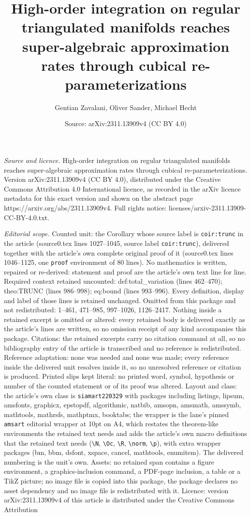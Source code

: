 \documentclass[10pt,a4paper]{amsart}
\title[High-order integration on regular triangulated manifolds rea]{High-order integration on regular triangulated manifolds reaches super-algebraic approximation rates through cubical re-parameterizations}
\author{Gentian Zavalani, Oliver Sander, Michael Hecht}
\date{Source: arXiv:2311.13909v4 (CC BY 4.0)}
\begin{document}
\maketitle

\noindent\emph{Source and licence.} High-order integration on regular triangulated manifolds reaches super-algebraic approximation rates through cubical re-parameterizations. Version arXiv:2311.13909v4 (CC BY 4.0), distributed under the Creative Commons Attribution 4.0 International licence, as recorded in the arXiv licence metadata for this exact version and shown on the abstract page https://arxiv.org/abs/2311.13909v4. Full rights notice: licenses/arxiv-2311.13909-CC-BY-4.0.txt.\par\smallskip

\noindent\textit{Editorial scope.} Counted unit: the Corollary whose source label is \texttt{coir:trunc} in the article (source0.tex lines 1027--1045, source label \texttt{coir:trunc}), delivered together with the article's own complete original proof of it (source0.tex lines 1046--1125, one \texttt{proof} environment of 80 lines). No mathematics is written, repaired or re-derived: statement and proof are the article's own text line for line. Required context retained uncounted: def:total\_variation (lines 462--470); theo:TRUNC (lines 986--998); eq:bound (lines 993--996). Every definition, display and label of those lines is retained unchanged. Omitted from this package and not redistributed: 1--461, 471--985, 997--1026, 1126--2417. Nothing inside a retained excerpt is omitted or altered: every retained body is delivered exactly as the article's lines are written, so no omission receipt of any kind accompanies this package. Citations: the retained excerpts carry no citation command at all, so no bibliography entry of the article is transcribed and no reference is redistributed. Reference adaptation: none was needed and none was made; every reference inside the delivered unit resolves inside it, so no unresolved reference or citation is produced. Printed slips kept literal: no printed word, symbol, hypothesis or number of the counted statement or of its proof was altered. Layout and class: the article's own class is \texttt{siamart220329} with packages including listings, lipsum, amsfonts, graphicx, epstopdf, algorithmic, natbib, amsopn, amsmath, amssymb, mathtools, mathrsfs, mathptmx, booktabs; the wrapper is the lane's pinned \texttt{amsart} editorial wrapper at 10pt on A4, which restates the theorem-like environments the retained text needs and adds the article's own macro definitions that the retained text needs (\texttt{\textbackslash N}, \texttt{\textbackslash Oc}, \texttt{\textbackslash R}, \texttt{\textbackslash norm}, \texttt{\textbackslash p}), with extra wrapper packages (bm, bbm, dsfont, xspace, cancel, mathtools, enumitem). The delivered numbering is the unit's own. Assets: no retained span contains a figure environment, a graphics-inclusion command, a PDF-page inclusion, a table or a TikZ picture; no image file is copied into this package, the package declares no asset dependency and no image file is redistributed with it. Licence: version arXiv:2311.13909v4 of this article is distributed under the Creative Commons Attribution 
\end{document}
